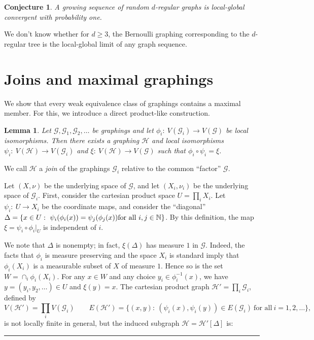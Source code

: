 \documentclass{article}
\newtheorem{lemma}[theorem]{Lemma}
\newtheorem{conjecture}[theorem]{Conjecture}
\newenvironment{proof}{{\bf Proof.}}{\hfill\rule{2mm}{2mm}\medskip}
\def\GG{\mathcal{G}}\def\HH{\mathcal{H}}\def\II{\mathcal{I}}
\begin{document}
\begin{conjecture}
A growing sequence of random $d$-regular graphs is local-global
convergent with probability one.
\end{conjecture}

{We don't know whether for $d\ge3$, the Bernoulli graphing
corresponding to the $d$-regular tree is the local-global limit of
any graph sequence.}

\section{Joins and maximal graphings}\label{SEC:JOINS}

{We show that every weak equivalence class of graphings contains a
maximal member. For this, we introduce a direct product-like
construction.

\begin{lemma}\label{LEM:JOIN}
Let $\GG,\GG_1,\GG_2,\dots$ be graphings and let $\phi_i:~V(\GG_i)\to
V(\GG)$ be local isomorphisms. Then there exists a graphing $\HH$ and
local isomorphisms $\psi_i:~V(\HH)\to V(\GG_i)$ and $\xi:~V(\HH)\to
V(\GG)$ such that $\phi_i\circ\psi_i=\xi$.
\end{lemma}

We call $\HH$ a {\it join} of the graphings $\GG_i$ relative to the
common ``factor'' $\GG$.

\medskip

\begin{proof}
Let $(X,\nu)$ be the underlying space of $\GG$, and let $(X_i,\nu_i)$
be the underlying space of $\GG_i$. First, consider the cartesian
product space $U=\prod_i X_i$. Let $\psi_i:~U\to X_i$ be the
coordinate maps, and consider the ``diagonal'' $\Delta=\{x\in
U:~\psi_i(\phi_i(x))=\psi_j(\phi_j(x))\text{for all }i,j\in\mathbb{N}\}$.
By this definition, the map $\xi= \psi_i\circ\phi_i|_U$ is
independent of $i$.

We note that $\Delta$ is nonempty; in fact, $\xi(\Delta)$ has measure
$1$ in $\GG$. Indeed, the facts that $\phi_i$ is measure preserving
and the space $X_i$ is standard imply that $\phi_i(X_i)$ is a
measurable subset of $X$ of measure $1$. Hence so is the set
$W=\cap_i\phi_i(X_i)$. For any $x\in W$ and any choice
$y_i\in\phi_i^{-1}(x)$, we have $y=(y_i,y_2,\dots)\in U$ and
$\xi(y)=x$. The cartesian product graph $\HH'=\prod_i \GG_i$, defined
by
\[
V(\HH')=\prod_i V(\GG_i) \qquad
E(\HH')=\{(x,y):~(\psi_i(x),\psi_i(y))\in E(\GG_i)
~\text{for all}~i=1,2,\dots\},
\]
is not locally finite in general, but the induced subgraph
$\HH=\HH'[\Delta]$ is:


\end{proof}}
\end{document}
